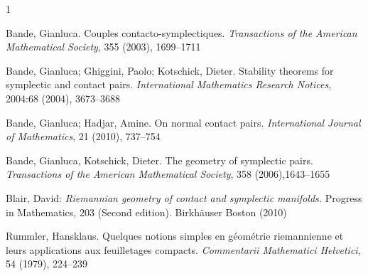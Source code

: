 \documentclass[12pt]{amsart}
\theoremstyle{definition}
\theoremstyle{remark}
\begin{document}
\begin{thebibliography}{1}


Bande, Gianluca. Couples contacto-symplectiques.  \textit{Transactions of the American Mathematical Society}, 355 (2003), 1699--1711 

Bande, Gianluca; Ghiggini, Paolo; Kotschick, Dieter. Stability theorems for symplectic and contact pairs. \textit{International Mathematics Research Notices}, 2004:68 (2004), 3673--3688


Bande, Gianluca; Hadjar, Amine. On normal contact pairs. \textit{International Journal of Mathematics}, 21 (2010), 737--754 

Bande, Gianluca, Kotschick, Dieter. The geometry of symplectic pairs. \textit{Transactions of the American Mathematical Society}, 358 (2006),1643--1655


Blair, David: \textit{Riemannian geometry of contact and symplectic manifolds.} Progress in Mathematics, 203 (Second edition). Birkh\"auser Boston (2010)

Rummler, Hansklaus. Quelques notions simples en g\'eom\'etrie riemannienne et leurs applications aux feuilletages compacts. \textit{Commentarii Mathematici Helvetici}, 54 (1979), 224--239

\end{thebibliography}
\end{document}
